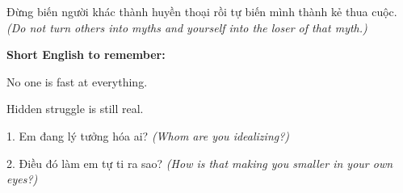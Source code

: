\begin{baihoc}
Đừng biến người khác thành huyền thoại rồi tự biến mình thành kẻ thua cuộc.
\textit{(Do not turn others into myths and yourself into the loser of that myth.)}
\end{baihoc}

\begin{ghinhoanh}
\textbf{Short English to remember:}

No one is fast at everything.

Hidden struggle is still real.
\end{ghinhoanh}

\begin{tuhocnhanh}
1. Em đang lý tưởng hóa ai? \textit{(Whom are you idealizing?)}

2. Điều đó làm em tự ti ra sao? \textit{(How is that making you smaller in your own eyes?)}
\end{tuhocnhanh}
\ngancach